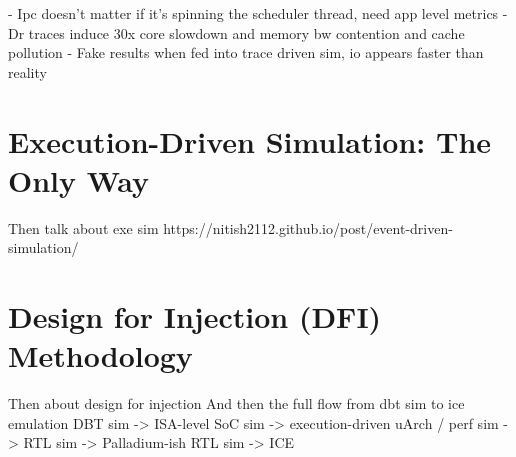 - Ipc doesn't matter if it's spinning the scheduler thread, need app level metrics
- Dr traces induce 30x core slowdown and memory bw contention and cache pollution
- Fake results when fed into trace driven sim, io appears faster than reality

\section{Execution-Driven Simulation: The Only Way}

Then talk about exe sim
https://nitish2112.github.io/post/event-driven-simulation/

\section{Design for Injection (DFI) Methodology}

Then about design for injection
And then the full flow from dbt sim to ice emulation
DBT sim -> ISA-level SoC sim -> execution-driven uArch / perf sim -> RTL sim -> Palladium-ish RTL sim -> ICE
